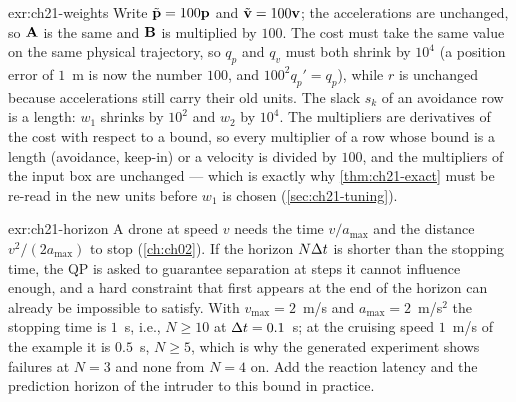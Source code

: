 \begin{solution}{exr:ch21-weights}
Write $\tilde{\mathbf{p}}=100\mathbf{p}$ and $\tilde{\mathbf{v}}=100\mathbf{v}$; the accelerations are unchanged, so $\mathbf{A}$ is the same and $\mathbf{B}$ is multiplied by $100$. The cost must take the same value on the same physical trajectory, so $q_p$ and $q_v$ must both shrink by $10^4$ (a position error of $1$~m is now the number $100$, and $100^2q_p'=q_p$), while $r$ is unchanged because accelerations still carry their old units. The slack $s_k$ of an avoidance row is a length: $w_1$ shrinks by $10^2$ and $w_2$ by $10^4$. The multipliers are derivatives of the cost with respect to a bound, so every multiplier of a row whose bound is a length (avoidance, keep-in) or a velocity is divided by $100$, and the multipliers of the input box are unchanged --- which is exactly why \cref{thm:ch21-exact} must be re-read in the new units before $w_1$ is chosen (\cref{sec:ch21-tuning}).
\end{solution}
\begin{solution}{exr:ch21-horizon}
A drone at speed $v$ needs the time $v/a_{\max}$ and the distance $v^2/(2a_{\max})$ to stop (\cref{ch:ch02}). If the horizon $N\Delta t$ is shorter than the stopping time, the QP is asked to guarantee separation at steps it cannot influence enough, and a hard constraint that first appears at the end of the horizon can already be impossible to satisfy. With $v_{\max}=2$~m/s and $a_{\max}=2$~m/s$^2$ the stopping time is $1$~s, i.e., $N\ge10$ at $\Delta t=0.1$~s; at the cruising speed $1$~m/s of the example it is $0.5$~s, $N\ge5$, which is why the generated experiment shows failures at $N=3$ and none from $N=4$ on. Add the reaction latency and the prediction horizon of the intruder to this bound in practice.
\end{solution}
